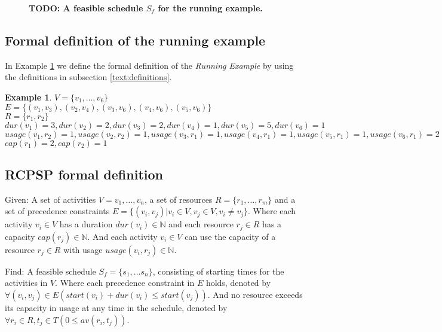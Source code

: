 \documentclass{article}
\theoremstyle{definition}
\newcommand{\TODO}[1]{{\color{red}\textbf{TODO: #1}}}
\newtheorem{example}{Example}[section]
\newcommand{\av}[2]{\ensuremath{av(r_{#1}, t_{#2})}} %
\newcommand{\capa}[1]{\ensuremath{cap(r_{#1})}} %
\newcommand{\dur}[1]{\ensuremath{dur(v_{#1})}} %
\newcommand{\usage}[2]{\ensuremath{usage(v_{#1}, r_{#2})}} %
\newcommand{\start}[1]{\ensuremath{start(v_{#1})}} %
\newenvironment{definition}[1][Definition]{\begin{trivlist}
\item[\hskip \labelsep {\bfseries #1}]}{\end{trivlist}}
\begin{document}
\begin{figure}[h]
	\centering
	
	\caption{\TODO{A feasible schedule $S_f$ for the running example.} }
	\label{fig:feasible_schedule}
\end{figure}

\subsection{Formal definition of the running example}

In Example \ref{exmp:running} we define the formal definition of the \emph{Running Example} by using the definitions in subsection \ref{text:definitions}.
\begin{example}
\label{exmp:running}
$V = \{v_1, \ldots, v_6\}$\\
$E = \{(v_1, v_3), (v_2, v_4), (v_3, v_6), (v_4, v_6), (v_5, v_6)\}$\\
$R = \{r_1, r_2\}$\\
$\dur{1} = 3, \dur{2} = 2, \dur{3} = 2, \dur{4} = 1, \dur{5} = 5, \dur{6} = 1$\\
$\usage{1}{2} = 1, \usage{2}{2} = 1, \usage{3}{1} = 1, \usage{4}{1} = 1, \usage{5}{1} = 1, \usage{6}{1} = 2$\\
$\capa{1} = 2, \capa{2} = 1$
\end{example}


\subsection{RCPSP formal definition}

\begin{definition}
Given:
A set of activities $V = v_1, \ldots, v_n$, a set of resources $R = \{r_1, \ldots, r_m\}$ and a set of precedence constraints $E =  \{(v_i, v_j) | v_i \in V, v_j \in V, v_i \neq v_j\}$.
Where each activity $v_i \in V$ has a duration $\dur{i} \in \mathbb{N}$ and each resource $r_j \in R$ has a capacity $\capa{j} \in \mathbb{N}$. 
And each activity $v_i \in V$ can use the capacity of a resource $r_j \in R$ with usage $\usage{i}{j} \in \mathbb{N}$.

Find:
A feasible schedule $S_f = \{s_1, \ldots s_n\}$, consisting of starting times for the activities in $V$.
Where each precedence constraint in $E$ holds, denoted by $\forall (v_i, v_j) \in E (\start{i} + \dur{i} \leq \start{j})$.
And no resource exceeds its capacity in usage at any time in the schedule, denoted by $\forall r_i \in R, t_j \in T (0 \leq \av{i}{j})$.
\end{definition}
\end{document}
